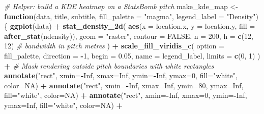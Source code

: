 \documentclass[
]{article}
\newenvironment{Shaded}{\begin{snugshade}}{\end{snugshade}}
\newcommand{\AttributeTok}[1]{\textcolor[rgb]{0.13,0.29,0.53}{#1}}
\newcommand{\CommentTok}[1]{\textcolor[rgb]{0.56,0.35,0.01}{\textit{#1}}}
\newcommand{\ConstantTok}[1]{\textcolor[rgb]{0.56,0.35,0.01}{#1}}
\newcommand{\ControlFlowTok}[1]{\textcolor[rgb]{0.13,0.29,0.53}{\textbf{#1}}}
\newcommand{\DecValTok}[1]{\textcolor[rgb]{0.00,0.00,0.81}{#1}}
\newcommand{\FloatTok}[1]{\textcolor[rgb]{0.00,0.00,0.81}{#1}}
\newcommand{\FunctionTok}[1]{\textcolor[rgb]{0.13,0.29,0.53}{\textbf{#1}}}
\newcommand{\NormalTok}[1]{#1}
\newcommand{\OtherTok}[1]{\textcolor[rgb]{0.56,0.35,0.01}{#1}}
\newcommand{\SpecialCharTok}[1]{\textcolor[rgb]{0.81,0.36,0.00}{\textbf{#1}}}
\newcommand{\StringTok}[1]{\textcolor[rgb]{0.31,0.60,0.02}{#1}}
\begin{document}
\begin{Shaded}
\begin{Highlighting}[]
\CommentTok{\# Helper: build a KDE heatmap on a StatsBomb pitch}
\NormalTok{make\_kde\_map }\OtherTok{\textless{}{-}} \ControlFlowTok{function}\NormalTok{(data, title, subtitle,}
                         \AttributeTok{fill\_palette =} \StringTok{"magma"}\NormalTok{, }\AttributeTok{legend\_label =} \StringTok{"Density"}\NormalTok{) \{}
  \FunctionTok{ggplot}\NormalTok{(data) }\SpecialCharTok{+}
    \FunctionTok{stat\_density\_2d}\NormalTok{(}
      \FunctionTok{aes}\NormalTok{(}\AttributeTok{x =}\NormalTok{ location.x, }\AttributeTok{y =}\NormalTok{ location.y, }\AttributeTok{fill =} \FunctionTok{after\_stat}\NormalTok{(ndensity)),}
      \AttributeTok{geom     =} \StringTok{"raster"}\NormalTok{,}
      \AttributeTok{contour  =} \ConstantTok{FALSE}\NormalTok{,}
      \AttributeTok{n        =} \DecValTok{200}\NormalTok{,}
      \AttributeTok{h        =} \FunctionTok{c}\NormalTok{(}\DecValTok{12}\NormalTok{, }\DecValTok{12}\NormalTok{)   }\CommentTok{\# bandwidth in pitch metres}
\NormalTok{    ) }\SpecialCharTok{+}
    \FunctionTok{scale\_fill\_viridis\_c}\NormalTok{(}
      \AttributeTok{option    =}\NormalTok{ fill\_palette,}
      \AttributeTok{direction =} \SpecialCharTok{{-}}\DecValTok{1}\NormalTok{,}
      \AttributeTok{begin     =} \FloatTok{0.05}\NormalTok{,}
      \AttributeTok{name      =}\NormalTok{ legend\_label,}
      \AttributeTok{limits    =} \FunctionTok{c}\NormalTok{(}\DecValTok{0}\NormalTok{, }\DecValTok{1}\NormalTok{)}
\NormalTok{    ) }\SpecialCharTok{+}
    \CommentTok{\# Mask rendering outside pitch boundaries with white rectangles}
    \FunctionTok{annotate}\NormalTok{(}\StringTok{"rect"}\NormalTok{, }\AttributeTok{xmin=}\SpecialCharTok{{-}}\ConstantTok{Inf}\NormalTok{, }\AttributeTok{xmax=}\ConstantTok{Inf}\NormalTok{, }\AttributeTok{ymin=}\SpecialCharTok{{-}}\ConstantTok{Inf}\NormalTok{, }\AttributeTok{ymax=}\DecValTok{0}\NormalTok{,   }\AttributeTok{fill=}\StringTok{"white"}\NormalTok{, }\AttributeTok{color=}\ConstantTok{NA}\NormalTok{) }\SpecialCharTok{+}
    \FunctionTok{annotate}\NormalTok{(}\StringTok{"rect"}\NormalTok{, }\AttributeTok{xmin=}\SpecialCharTok{{-}}\ConstantTok{Inf}\NormalTok{, }\AttributeTok{xmax=}\ConstantTok{Inf}\NormalTok{, }\AttributeTok{ymin=}\DecValTok{80}\NormalTok{,   }\AttributeTok{ymax=}\ConstantTok{Inf}\NormalTok{, }\AttributeTok{fill=}\StringTok{"white"}\NormalTok{, }\AttributeTok{color=}\ConstantTok{NA}\NormalTok{) }\SpecialCharTok{+}
    \FunctionTok{annotate}\NormalTok{(}\StringTok{"rect"}\NormalTok{, }\AttributeTok{xmin=}\SpecialCharTok{{-}}\ConstantTok{Inf}\NormalTok{, }\AttributeTok{xmax=}\DecValTok{0}\NormalTok{,   }\AttributeTok{ymin=}\SpecialCharTok{{-}}\ConstantTok{Inf}\NormalTok{, }\AttributeTok{ymax=}\ConstantTok{Inf}\NormalTok{, }\AttributeTok{fill=}\StringTok{"white"}\NormalTok{, }\AttributeTok{color=}\ConstantTok{NA}\NormalTok{) }\SpecialCharTok{+}

\end{Highlighting}
\end{Shaded}
\end{document}

